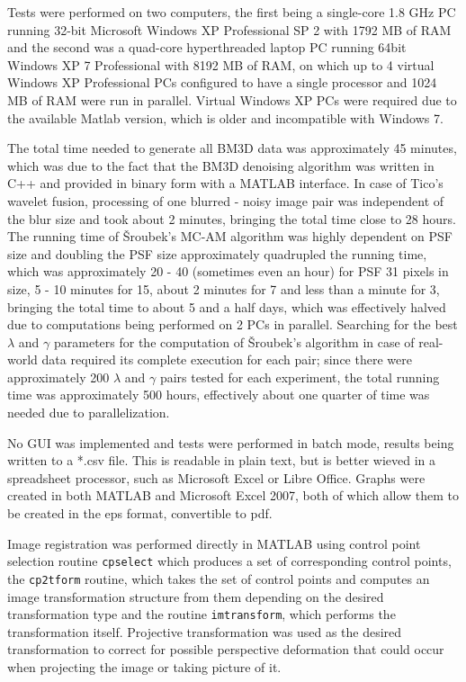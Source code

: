 \documentclass[12pt,notitlepage]{report}
\begin{document}
Tests were performed on two computers, the first being a single-core 1.8 GHz PC running 32-bit Microsoft Windows XP Professional SP 2 with 1792 MB of RAM and the second was a quad-core hyperthreaded laptop PC running 64bit 
Windows XP 7 Professional with 8192 MB of RAM, on which up to 4 virtual Windows XP Professional PCs configured to have a single processor and 1024 MB of RAM were run in parallel. Virtual Windows XP PCs were required due to the available Matlab version, which is older and incompatible with Windows 7.

The total time needed to generate all BM3D data was approximately 45 minutes, which was due to the fact that the BM3D denoising algorithm was written in C++ and provided in binary form with a MATLAB interface. In case of Tico's wavelet fusion, processing of one blurred - noisy image pair was independent of the blur size and took about 2 minutes, bringing the total time close to 28 hours. The running time of Šroubek's MC-AM algorithm was highly dependent on PSF size and doubling the PSF size approximately quadrupled the running time, which was approximately 20 - 40 (sometimes even an hour) for PSF 31 pixels in size, 5 - 10 minutes for 15, about 2 minutes for 7 and less than a minute for 3, bringing the total time to about 5 and a half days, which was effectively halved due to computations being performed on 2 PCs in parallel. Searching for the best $\lambda$ and $\gamma$ parameters for the computation of Šroubek's algorithm in case of real-world data required its complete execution for each pair; since there were approximately 200 $\lambda$ and $\gamma$ pairs tested for each experiment, the total running time was approximately 500 hours, effectively about one quarter of time was needed due to parallelization.  

No GUI was implemented and tests were performed in batch mode, results being written to a *.csv file. This is readable in plain text, but is better wieved in a spreadsheet processor, such as Microsoft Excel or Libre Office. Graphs were created in both MATLAB and Microsoft Excel 2007, both of which allow them to be created in the eps format, convertible to pdf. 

Image registration was performed directly in MATLAB using control point selection routine \texttt{cpselect} which produces a set of corresponding control points, the \texttt{cp2tform} routine, which takes the set of control points and computes an image transformation structure from them depending on the desired transformation type and the routine \texttt{imtransform}, which performs the transformation itself. Projective transformation was used as the desired transformation to correct for possible perspective deformation that could occur when projecting the image or taking picture of it.  
\end{document}
